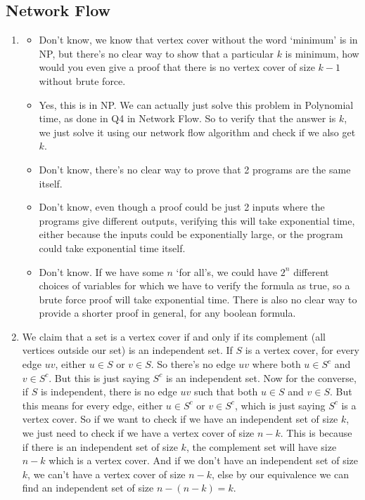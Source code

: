 \documentclass[12pt]{report}
\begin{document}
\subsection*{\Large\bfseries Network Flow}
\begin{enumerate}[label=\textbf{\arabic*.}]

    \item
    \begin{itemize}
        \item Don't know, we know that vertex cover without the word `minimum' is in NP, but there's no clear way to show that a particular
        $k$ is minimum, how would you even give a proof that there is no vertex cover of size $k-1$ without brute force.
        \item Yes, this is in NP. We can actually just solve this problem in Polynomial time, as done in Q4 in Network Flow. So to 
        verify that the answer is $k$, we just solve it using our network flow algorithm and check if we also get $k$.
        \item Don't know, there's no clear way to prove that 2 programs are the same itself.
        \item Don't know, even though a proof could be just 2 inputs where the programs give different outputs, verifying this will take
        exponential time, either because the inputs could be exponentially large, or the program could take exponential time itself.
        \item Don't know. If we have some $n$ `for all's, we could have $2^n$ different choices of variables for which we have to verify 
        the formula as true, so a brute force proof will take exponential time. There is also no clear way to provide a shorter proof 
        in general, for any boolean formula.
    \end{itemize}

    \item We claim that a set is a vertex cover if and only if its complement (all vertices outside our set) is an independent set. If $S$
    is a vertex cover, for every edge $uv$, either $u \in S$ or $v \in S$. So there's no edge $uv$ where both $u \in S^c$ and $v \in S^c$. 
    But this is just saying $S^c$ is an independent set. Now for the converse, if $S$ is independent, there is no edge $uv$ such that 
    both $u \in S$ and $v \in S$. But this means for every edge, either $u \in S^c$ or $v \in S^c$, which is just saying $S^c$ is a vertex 
    cover. So if we want to check if we have an independent set of size $k$, we just need to check if we have a vertex cover of size $n-k$.
    This is because if there is an independent set of size $k$, the complement set will have size $n-k$ which is a vertex cover. And if we
    don't have an independent set of size $k$, we can't have a vertex cover of size $n-k$, else by our equivalence we can find an independent 
    set of size $n - (n-k) = k$.
    

\end{enumerate}
\end{document}

